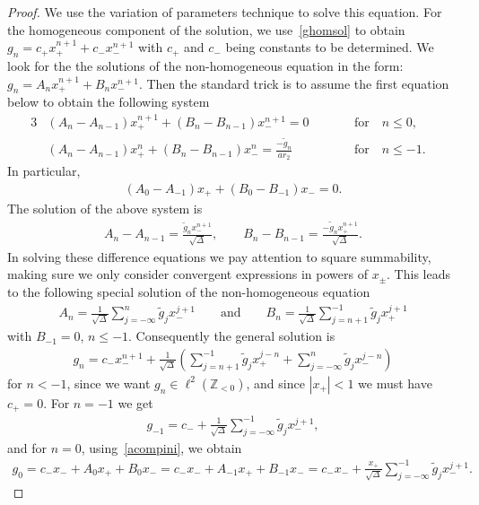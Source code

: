 \begin{proof}
We use the variation of parameters technique to solve this equation.
For the homogeneous component of the solution, we use~\eqref{ghomsol} to obtain $g_n=c_+x_+^{n+1}+c_-x_-^{n+1}$ with
$c_+$ and $c_-$ being constants to be determined.
We look for the the solutions of the non-homogeneous equation in the form: $g_n=A_nx_+^{n+1}+B_nx_-^{n+1}$.
Then the standard trick is to assume the f\/irst equation below to obtain the following system
\begin{alignat*}{3}
&  (A_n -A_{n-1})x_+^{n+1}+(B_n-B_{n-1})x_-^{n+1}=0 \qquad &&\text{for}\quad  n\leq 0,&
\\
& (A_n -A_{n-1})x_+^n+(B_n-B_{n-1})x_-^n=\frac{-\tilde{g}_n}{ar_2} \qquad && \text{for}\quad  n\leq -1. &
\end{alignat*}
In particular,
\begin{gather}
\label{acompini}
(A_0 -A_{-1})x_++(B_0-B_{-1})x_-=0.
\end{gather}
The solution of the above system is
\begin{gather}
\label{acompgen}
A_n-A_{n-1}=\frac{\tilde{g}_nx_-^{n+1}}{\sqrt{\Delta}},
\qquad
B_n-B_{n-1}=\frac{-\tilde{g}_nx_+^{n+1}}{\sqrt{\Delta}}.
\end{gather}
In solving these dif\/ference equations we pay attention to square summability, making sure we only consider convergent
expressions in powers of $x_\pm$.
This leads to the following special solution of the non-homogeneous equation
\begin{gather*}
A_n=\frac{1}{\sqrt{\Delta}}\sum\limits_{j=-\infty}^n\tilde{g}_jx_-^{j+1}
\qquad
\text{and}
\qquad
B_n=\frac{1}{\sqrt{\Delta}}\sum\limits_{j=n+1}^{-1}\tilde{g}_jx_+^{j+1}
\end{gather*}
with $B_{-1}=0$, $n\leq -1$.
Consequently the general solution is
\begin{gather*}
g_n=c_-x_-^{n+1}+\frac{1}{\sqrt{\Delta}}\left(\sum\limits_{j=n+1}^{-1}\tilde{g}_jx_+^{j-n}+\sum\limits_{j=-\infty}^n\tilde{g}_jx_-^{j-n}\right)
\end{gather*}
for $n<-1$, since we want $g_n\in\ell^2({\mathbb Z}_{<0})$, and since $|x_+|<1$ we must have $c_+=0$.
For $n=-1$ we get
\begin{gather*}
g_{-1}=c_-+\frac{1}{\sqrt{\Delta}}\sum\limits_{j=-\infty}^{-1}\tilde{g}_jx_-^{j+1},
\end{gather*}
and for $n=0$, using~\eqref{acompini}, we obtain
\begin{gather*}
g_{0}=c_- x_-+A_0x_++B_0x_-= c_- x_-+A_{-1}x_++B_{-1}x_-=c_- x_-+\frac{x_+}{\sqrt{\Delta}}\sum\limits_{j=-\infty}^{-1}\tilde{g}_jx_-^{j+1}.
\end{gather*}


\end{proof}
